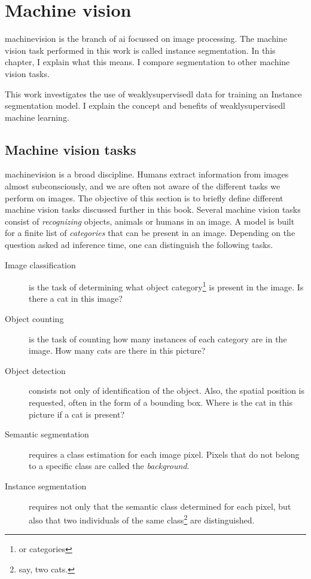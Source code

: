 \chapter{Machine vision}

\Gls{machinevision} is the branch of \Gls{ai} focussed on image processing.
The machine vision task performed in this work is called instance \Gls{segmentation}.
In this chapter, I explain what this means. 
I compare segmentation to other machine vision tasks.

This work investigates the use of \Gls{weaklysupervisedl} data for training an Instance segmentation model. 
I explain the concept and benefits of \Gls{weaklysupervisedl} machine learning.

\section{Machine vision tasks \label{sec:machinevisiontasks}}

\Gls{machinevision} is a broad discipline. 
Humans extract information from images almost subconsciously, and we are often not aware of the different tasks we perform on images.
The objective of this section is to briefly define different machine vision tasks discussed further in this book. 
Several machine vision tasks consist of \textit{recognizing} objects, animals or humans in an image.
A model is built for a finite list of \textit{categories} that can be present in an image.
Depending on the question asked ad inference time, one can distinguish the following tasks.

\begin{description}
    \item[Image classification] is the task of determining what object category\footnote{or categories} is present in the image. Is there a cat in this image?
    \item[Object counting] is the task of counting how many instances of each category are in the image. How many cats are there in this picture? 
    \item[Object detection] consists not only of identification of the object. Also, the spatial position is requested, often in the form of a bounding box. Where is the cat in this picture if a cat is present?
    \item[Semantic segmentation] requires a class estimation for each image pixel. Pixels that do not belong to a specific class are called the \textit{background}.
    \item[Instance segmentation] requires not only that the semantic class determined for each pixel, but also that two individuals of the same class\footnote{say, two cats.} are distinguished.   
\end{description}

